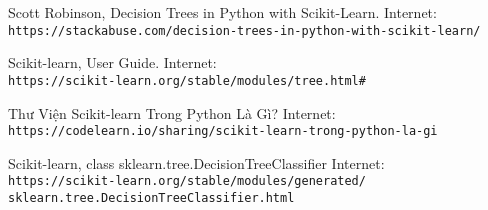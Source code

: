\begin{thebibliography}{99}

Scott Robinson, Decision Trees in Python with Scikit-Learn.
Internet:\\
\texttt{https://stackabuse.com/decision-trees-in-python-with-scikit-learn/}

Scikit-learn, User Guide.
Internet:\\
\texttt{https://scikit-learn.org/stable/modules/tree.html\#}

Thư Viện Scikit-learn Trong Python Là Gì?
Internet:\\
\texttt{https://codelearn.io/sharing/scikit-learn-trong-python-la-gi}

Scikit-learn, class sklearn.tree.DecisionTreeClassifier
Internet:\\
\texttt{https://scikit-learn.org/stable/modules/generated/\\
sklearn.tree.DecisionTreeClassifier.html}

\end{thebibliography}
